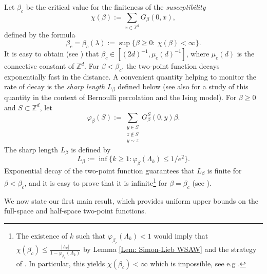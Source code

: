 \documentclass[11pt,a4paper]{article}
\numberwithin{equation}{section}
\theoremstyle{plain}
\theoremstyle{definition}
\begin{document}
Let $\beta_c$ be the critical value for the finiteness of the {\em susceptibility} 
\begin{equation}\label{eq: def susceptibility}
\chi(\beta):=\sum_{x\in \mathbb Z^d}G_\beta(0,x),
\end{equation} defined by the formula
\begin{equation}
    \beta_c=\beta_c(\lambda):=\sup\Big\lbrace \beta\geq 0: \: \chi(\beta)<\infty \Big\rbrace.
\end{equation}
It is easy to obtain (see \cite{SladeSaintFlourLaceExpansion2006,BauerschmidtDCGoodmanSlade}) that $\beta_c\in[(2d)^{-1},\mu_c(d)^{-1}]$, where $\mu_c(d)$ is the connective constant of $\mathbb Z^d$. For $\beta<\beta_c$, the two-point function decays exponentially fast in the distance. A convenient quantity helping to monitor the rate of decay is the \emph{sharp length} $L_\beta$ defined below (see also \cite{DuminilTassionNewProofSharpness2016,PanisTriviality2023,DuminilPanis2024newLB} for a study of this quantity in the context of Bernoulli percolation and the Ising model). For $\beta\geq 0$ and $S\subset \mathbb Z^d$, let
\begin{equation}
	\varphi_\beta(S):=\sum_{\substack{y\in S\\ z\notin S\\ y\sim z}}G^S_\beta(0,y)\beta.
\end{equation}
The sharp length $L_\beta$ is defined by
\begin{equation}\label{eq: def L beta}
    L_\beta:=\inf\{k\ge1:\varphi_\beta(\Lambda_k)\le1/e^2\}.
\end{equation}
Exponential decay of the two-point function guarantees that  $L_\beta$ is finite for $\beta<\beta_c$, and it is easy to prove that it is infinite\footnote{The existence of $k$ such that $\varphi_{\beta_c}(\Lambda_k)<1$ would imply that $\chi(\beta_c)\leq \tfrac{|\Lambda_k|}{1-\varphi_{\beta_c}(\Lambda_k)}$ by Lemma \ref{Lem: Simon-Lieb WSAW} and the strategy of \cite{DuminilTassionNewProofSharpness2016}. In particular, this yields $\chi(\beta_c)<\infty$ which is impossible, see e.g \cite[(4.6)]{BauerschmidtDCGoodmanSlade}.} for $\beta=\beta_c$ (see \cite{SimonInequalityIsing1980,DuminilTassionNewProofSharpness2016}).

We now state our first main result, which provides uniform upper bounds on the full-space and half-space two-point functions.
\end{document}
